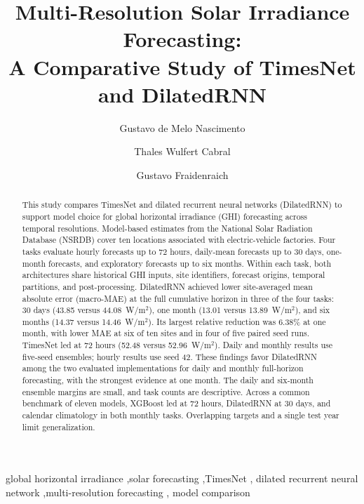 \documentclass[final,5p,times,twocolumn]{elsarticle}
\begin{document}
\raggedbottom

\begin{frontmatter}

\title{Multi-Resolution Solar Irradiance Forecasting:\\
A Comparative Study of TimesNet and DilatedRNN}

\author[unicamp]{Gustavo de Melo Nascimento}
\author[unicamp]{Thales Wulfert Cabral}
\author[unicamp]{Gustavo Fraidenraich}
\address[unicamp]{School of Electrical and Computer Engineering, University of Campinas, Campinas, SP, Brazil}

\begin{abstract}
This study compares TimesNet and dilated recurrent neural networks
(DilatedRNN) to support model choice for global horizontal irradiance (GHI)
forecasting across temporal resolutions. Model-based estimates from the
National Solar Radiation Database (NSRDB) cover ten locations associated
with electric-vehicle factories. Four tasks evaluate hourly forecasts up to
72 hours, daily-mean forecasts up to 30 days, one-month forecasts, and
exploratory forecasts up to six months. Within each task, both architectures
share historical GHI inputs, site identifiers, forecast origins, temporal
partitions, and post-processing. DilatedRNN achieved lower site-averaged
mean absolute error (macro-MAE) at the full cumulative horizon in three
of the four tasks: 30 days (43.85 versus 44.08~W/m$^2$), one month
(13.01 versus 13.89~W/m$^2$), and six months
(14.37 versus 14.46~W/m$^2$). Its largest relative reduction was
6.38\% at one month, with lower MAE at six of ten sites and in four of five
paired seed runs. TimesNet led at 72 hours
(52.48 versus 52.96~W/m$^2$). Daily and monthly results use five-seed
ensembles; hourly results use seed 42. These findings favor DilatedRNN
among the two evaluated implementations for daily and monthly full-horizon
forecasting, with the strongest evidence at one month. The daily and
six-month ensemble margins are small, and task counts are descriptive.
Across a common benchmark of eleven models, XGBoost led at 72 hours,
DilatedRNN at 30 days, and calendar climatology in both monthly tasks.
Overlapping targets and a single test year limit generalization.
\end{abstract}

\begin{keyword}
global horizontal irradiance \sep solar forecasting \sep TimesNet \sep
dilated recurrent neural network \sep multi-resolution forecasting \sep
model comparison
\end{keyword}

\end{frontmatter}
\end{document}
